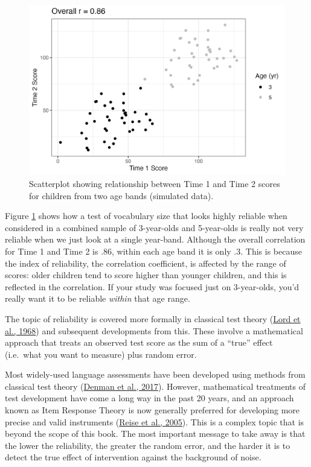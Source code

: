 \documentclass{krantz}
\begin{document}
\begin{figure}
\includegraphics[width=0.85\linewidth]{images_bw/reliability-by-age} \caption{Scatterplot showing relationship between Time 1 and Time 2 scores for children from two age bands (simulated data).}\label{fig:reliability-by-age}
\end{figure}

Figure \ref{fig:reliability-by-age} shows how a test of vocabulary size that looks highly reliable when considered in a combined sample of 3-year-olds and 5-year-olds is really not very reliable when we just look at a single year-band. Although the overall correlation for Time 1 and Time 2 is .86, within each age band it is only .3. This is because the index of reliability, the correlation coefficient, is affected by the range of scores: older children tend to score higher than younger children, and this is reflected in the correlation. If your study was focused just on 3-year-olds, you'd really want it to be reliable \emph{within} that age range.

The topic of reliability is covered more formally in classical test theory (\protect\hyperlink{ref-lord1968}{Lord et al., 1968})  and subsequent developments from this. These involve a mathematical approach that treats an observed test score as the sum of a ``true'' effect (i.e.~what you want to measure) plus random error.

Most widely-used language assessments have been developed using methods from classical test theory (\protect\hyperlink{ref-denman2017}{Denman et al., 2017}). However, mathematical treatments of test development have come a long way in the past 20 years, and an approach known as Item Response Theory is now generally preferred for developing more precise and valid instruments (\protect\hyperlink{ref-reise2005}{Reise et al., 2005}). This is a complex topic that is beyond the scope of this book. The most important message to take away is that the lower the reliability, the greater the random error, and the harder it is to detect the true effect of intervention against the background of noise.
\end{document}
